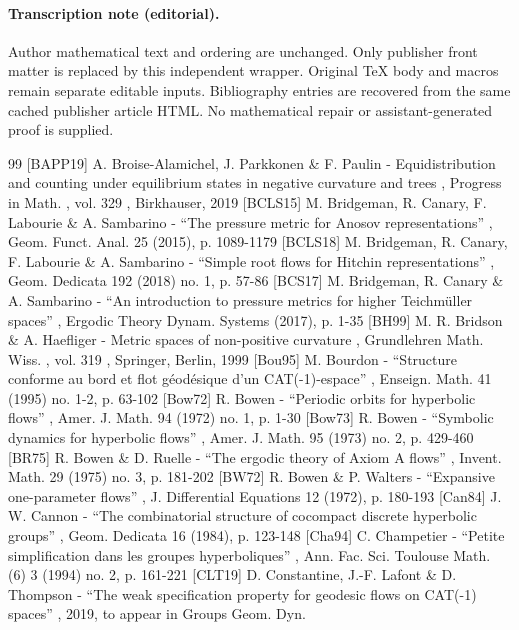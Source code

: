 \documentclass[11pt]{article}
\begin{document}
\paragraph{Transcription note (editorial).}
Author mathematical text and ordering are unchanged. Only publisher front matter is replaced by this independent wrapper. Original TeX body and macros remain separate editable inputs. Bibliography entries are recovered from the same cached publisher article HTML. No mathematical repair or assistant-generated proof is supplied.
\clearpage

\begin{thebibliography}{99}
 [BAPP19] A. Broise-Alamichel, J. Parkkonen \& F. Paulin - Equidistribution and counting under equilibrium states in negative curvature and trees , Progress in Math. , vol. 329 , Birkhauser, 2019
 [BCLS15] M. Bridgeman, R. Canary, F. Labourie \& A. Sambarino - “The pressure metric for Anosov representations” , Geom. Funct. Anal. 25 (2015), p. 1089-1179
 [BCLS18] M. Bridgeman, R. Canary, F. Labourie \& A. Sambarino - “Simple root flows for Hitchin representations” , Geom. Dedicata 192 (2018) no. 1, p. 57-86
 [BCS17] M. Bridgeman, R. Canary \& A. Sambarino - “An introduction to pressure metrics for higher Teichmüller spaces” , Ergodic Theory Dynam. Systems (2017), p. 1-35
 [BH99] M. R. Bridson \& A. Haefliger - Metric spaces of non-positive curvature , Grundlehren Math. Wiss. , vol. 319 , Springer, Berlin, 1999
 [Bou95] M. Bourdon - “Structure conforme au bord et flot géodésique d’un CAT(-1)-espace” , Enseign. Math. 41 (1995) no. 1-2, p. 63-102
 [Bow72] R. Bowen - “Periodic orbits for hyperbolic flows” , Amer. J. Math. 94 (1972) no. 1, p. 1-30
 [Bow73] R. Bowen - “Symbolic dynamics for hyperbolic flows” , Amer. J. Math. 95 (1973) no. 2, p. 429-460
 [BR75] R. Bowen \& D. Ruelle - “The ergodic theory of Axiom A flows” , Invent. Math. 29 (1975) no. 3, p. 181-202
 [BW72] R. Bowen \& P. Walters - “Expansive one-parameter flows” , J. Differential Equations 12 (1972), p. 180-193
 [Can84] J. W. Cannon - “The combinatorial structure of cocompact discrete hyperbolic groups” , Geom. Dedicata 16 (1984), p. 123-148
 [Cha94] C. Champetier - “Petite simplification dans les groupes hyperboliques” , Ann. Fac. Sci. Toulouse Math. (6) 3 (1994) no. 2, p. 161-221
 [CLT19] D. Constantine, J.-F. Lafont \& D. Thompson - “The weak specification property for geodesic flows on CAT(-1) spaces” , 2019, to appear in Groups Geom. Dyn.

\end{thebibliography}
\end{document}
